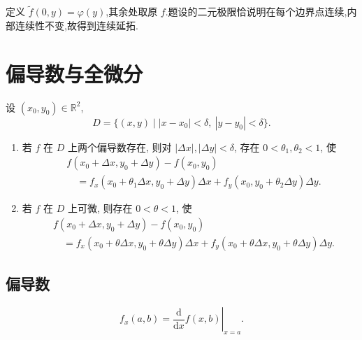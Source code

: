 \begin{solution}
    定义 $\widetilde f(0,y)=\varphi(y)$,其余处取原 $f$.题设的二元极限恰说明在每个边界点连续,内部连续性不变,故得到连续延拓.
\end{solution}


\newpage

\section{偏导数与全微分}

\begin{theorem}
    设 $(x_0,y_0)\in\mathbb{R}^2$,
    \[
        D=\{(x,y)\mid |x-x_0|<\delta,\ |y-y_0|<\delta\}.
    \]
    \begin{enumerate}
        \item 若 $f$ 在 $D$ 上两个偏导数存在, 则对 $|\Delta x|,|\Delta y|<\delta$, 存在 $0<\theta_1,\theta_2<1$, 使
              \[
                  \begin{aligned}
                       & f(x_0+\Delta x,y_0+\Delta y)-f(x_0,y_0)              \\
                       & \quad=f_x(x_0+\theta_1\Delta x,y_0+\Delta y)\Delta x
                      +f_y(x_0,y_0+\theta_2\Delta y)\Delta y.
                  \end{aligned}
              \]
        \item 若 $f$ 在 $D$ 上可微, 则存在 $0<\theta<1$, 使
              \[
                  \begin{aligned}
                       & f(x_0+\Delta x,y_0+\Delta y)-f(x_0,y_0)                  \\
                       & \quad=f_x(x_0+\theta\Delta x,y_0+\theta\Delta y)\Delta x
                      +f_y(x_0+\theta\Delta x,y_0+\theta\Delta y)\Delta y.
                  \end{aligned}
              \]
    \end{enumerate}
\end{theorem}



\subsection{偏导数}

\begin{proposition}[\markstar]
    \[
        f_x(a,b)=\left.\dfrac{\mathrm{d}}{\mathrm{d}x}f(x,b)\right|_{x=a}.
    \]
\end{proposition}

